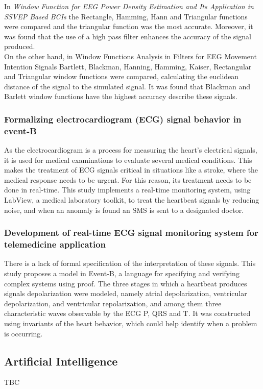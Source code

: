In \textit{Window Function for EEG Power Density Estimation and Its Application in SSVEP Based BCIs} the Rectangle, Hamming, Hann and Triangular functions were compared and the triangular function was the most accurate. Moreover, it was found that the use of a high pass filter enhances the accuracy of the signal produced.\\

On the other hand, in Window Functions Analysis in Filters for EEG Movement Intention Signals Bartlett, Blackman, Hanning, Hamming, Kaiser, Rectangular and Triangular window functions were compared, calculating the euclidean distance of the signal to the simulated signal. It was found that Blackman and Barlett window functions have the highest accuracy describe these signals.

\subsubsection{Formalizing electrocardiogram (ECG) signal behavior in event-B}

As the electrocardiogram is a process for measuring the heart's electrical signals, it is used for medical examinations to evaluate several medical conditions. This makes the treatment of ECG signals critical in situations like a stroke, where the medical response needs to be urgent. For this reason, its treatment needs to be done in real-time. This study implements a real-time monitoring system, using LabView, a medical laboratory toolkit, to treat the heartbeat signals by reducing noise, and when an anomaly is found an SMS is sent to a designated doctor.

\subsubsection{Development of real-time ECG signal monitoring system for telemedicine application}
There is a lack of formal specification of the interpretation of these signals. This study proposes a model in Event-B, a language for specifying and verifying complex systems using proof. The three stages in which a heartbeat produces signals depolarization were modeled, namely atrial depolarization, ventricular depolarization, and ventricular repolarization, and among them three characteristic waves observable by the ECG P, QRS and T. It was constructed using invariants of the heart behavior, which could help identify when a problem is occurring.


\subsection{Artificial Intelligence} 
TBC

